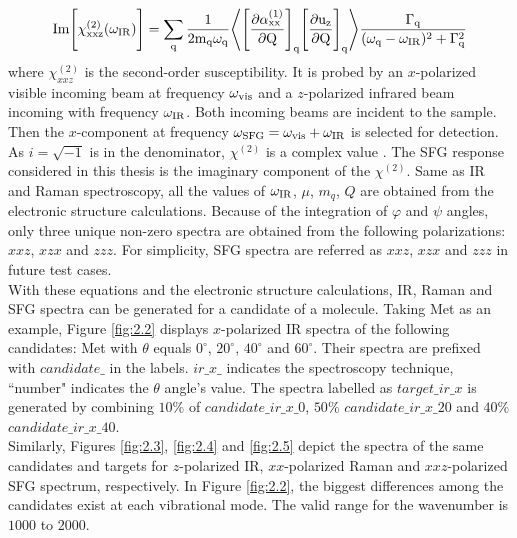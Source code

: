 \begin{equation} \label{eq:2.4}
\rm Im \Bigg\lbrack \chi^{(2)}_{xxz} (\omega_{\rm IR}) \Bigg\rbrack= \sum_{q} \frac{1}{2 m_{q} \omega_{\rm q}} \Bigg \langle \Bigg\lbrack \frac{\partial \alpha_{xx}^{(1)}}{\partial Q} \Bigg\rbrack_{q} \Bigg\lbrack \frac{\partial u_{z}}{\partial Q} \Bigg\rbrack_{q} \Bigg\rangle \frac{\Gamma_q}{(\omega_{\rm q}-\omega_{\rm IR})^{2}+\Gamma_q^{2}}
\end{equation} 
where $\chi^{(2)}_{xxz}$ is the second-order susceptibility. It is probed by an $x$-polarized visible incoming beam at frequency $\omega_{\rm vis}$ and a $z$-polarized infrared beam incoming with frequency $\omega_{\rm IR}$. Both incoming beams are incident to the sample. Then the $x$-component at frequency $\omega_{\rm SFG}=\omega_{\rm vis}+\omega_{\rm IR}$ is selected for detection. As $i=\sqrt{-1}$ is in the denominator, $\chi^{(2)}$ is a complex value \cite{KuoKaiHung:Thesis:2015}. The SFG response considered in this thesis is the imaginary component of the $\chi^{(2)}$. Same as IR and Raman spectroscopy, all the values of $\omega_{\rm IR}$, $\mu$, $m_q$, $Q$ are obtained from the electronic structure calculations. Because of the integration of $\varphi$ and $\psi$ angles, only three unique non-zero spectra are obtained from the following polarizations: $xxz$, $xzx$ and $zzz$. For simplicity, SFG spectra are referred as $xxz$, $xzx$ and $zzz$ in future test cases. \\

With these equations and the electronic structure calculations, IR, Raman and SFG spectra can be generated for a candidate of a molecule. Taking Met as an example, Figure \ref{fig:2.2} displays $x$-polarized IR spectra of the following candidates: Met with $\theta$ equals $0^{\circ}$, $20^{\circ}$, $40^{\circ}$ and $60^{\circ}$. Their spectra are prefixed with $candidate\_$ in the labels. $ir\_x\_$ indicates the spectroscopy technique, ``number" indicates the $\theta$ angle's value. The spectra labelled as $target\_ir\_x$ is generated by combining $10\%$ of $candidate\_ir\_x\_0$, $50\%$ $candidate\_ir\_x\_20$ and $40\%$ $candidate\_ir\_x\_40$. \\

Similarly, Figures \ref{fig:2.3}, \ref{fig:2.4} and \ref{fig:2.5} depict the spectra of the same candidates and targets for $z$-polarized IR, $xx$-polarized Raman and $xxz$-polarized SFG spectrum, respectively. In Figure \ref{fig:2.2}, the biggest differences among the candidates exist at each vibrational mode. The valid range for the wavenumber is $1000$ to $2000$. \\

